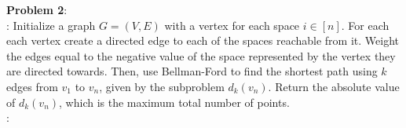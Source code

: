 \documentclass{article}
\begin{document}
\textbf{Problem 2}: \\[1.0ex]
: Initialize a graph $G = (V, E)$ with a vertex for each space $i \in [n]$. For each each vertex create a directed edge to each of the spaces reachable from it. Weight the edges equal to the negative value of the space represented by the vertex they are directed towards. Then, use Bellman-Ford to find the shortest path using $k$ edges from $v_1$ to $v_n$, given by the subproblem $d_{k}(v_n)$. Return the absolute value of $d_{k}(v_n)$, which is the maximum total number of points. \\[0.5ex]
:
\end{document}
